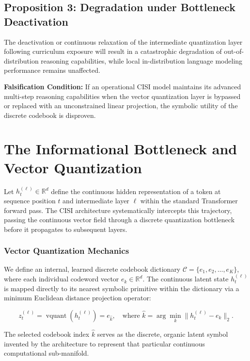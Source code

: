 \section*{Proposition 3: Degradation under Bottleneck Deactivation}
The deactivation or continuous relaxation of the intermediate quantization layer following curriculum exposure will result in a catastrophic degradation of out-of-distribution reasoning capabilities, while local in-distribution language modeling performance remains unaffected.

\textbf{Falsification Condition:} If an operational CISI model maintains its advanced multi-step reasoning capabilities when the vector quantization layer is bypassed or replaced with an unconstrained linear projection, the symbolic utility of the discrete codebook is disproven.

\chapter{The Informational Bottleneck and Vector Quantization}

Let $h_t^{(\ell)} \in \mathbb{R}^{d}$ define the continuous hidden representation of a token at sequence position $t$ and intermediate layer $\ell$ within the standard Transformer forward pass. The CISI architecture systematically intercepts this trajectory, passing the continuous vector field through a discrete quantization bottleneck before it propagates to subsequent layers.

\subsection{Vector Quantization Mechanics}
We define an internal, learned discrete codebook dictionary $\mathcal{C} = \{e_1, e_2, \dots, e_K\}$, where each individual codeword vector $e_k \in \mathbb{R}^{d}$. The continuous latent state $h_t^{(\ell)}$ is mapped directly to its nearest symbolic primitive within the dictionary via a minimum Euclidean distance projection operator:

\begin{equation}
z_t^{(\ell)} = \operatorname{vquant}\left(h_t^{(\ell)}\right) = e_{\hat{k}}, \quad \text{where } \hat{k} = \arg\min_{k} \|h_t^{(\ell)} - e_k\|_2.
\end{equation}

The selected codebook index $\hat{k}$ serves as the discrete, organic latent symbol invented by the architecture to represent that particular continuous computational sub-manifold.

